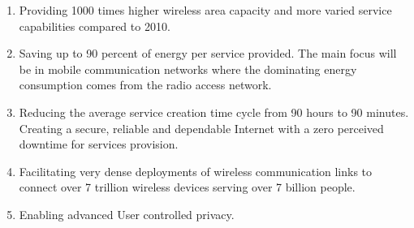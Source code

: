 \documentclass[14pt]{article}
\begin{document}
\begin{enumerate}
\item Providing 1000 times higher wireless area capacity and more varied service capabilities compared to 2010.
\item Saving up to 90 percent of energy per service provided. The main focus will be in mobile communication networks where the dominating energy consumption comes from the radio access network.
\item Reducing the average service creation time cycle from 90 hours to 90 minutes. Creating a secure, reliable and dependable Internet with a zero perceived downtime for services provision.
\item Facilitating very dense deployments of wireless communication links to connect over 7 trillion wireless devices serving over 7 billion people.
\item Enabling advanced User controlled privacy.
\end{enumerate}
\end{document}
